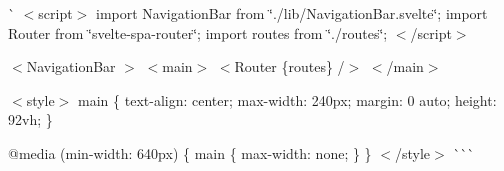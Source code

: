 \`{} $<$script$>$ import Navigation\+Bar from \char`\"{}./lib/\+Navigation\+Bar.\+svelte\char`\"{}; import Router from \char`\"{}svelte-\/spa-\/router\char`\"{}; import routes from \char`\"{}./routes\char`\"{}; $<$/script$>$

$<$\+Navigation\+Bar $>$ $<$main$>$ \texorpdfstring{$<$}{<}Router \{routes\} /\texorpdfstring{$>$}{>} $<$/main$>$

$<$style$>$ main \{ text-\/align\+: center; max-\/width\+: 240px; margin\+: 0 auto; height\+: 92vh; \}

@media (min-\/width\+: 640px) \{ main \{ max-\/width\+: none; \} \} $<$/style$>$ \`{}\`{}\`{} 
